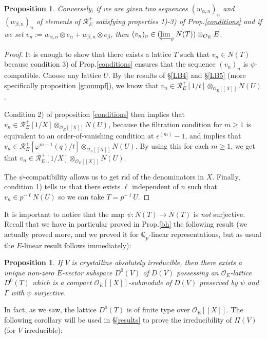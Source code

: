 \documentclass[11pt]{amsart}
\def\limproj{\mathop{\oalign{{\rm lim}\cr 
\hidewidth$\longleftarrow$\hidewidth\cr}}}
\def\Q{{\mathbb Q}_p}
\def\O{{\mathcal O}_E}
\newtheorem{prop}[definit]{\bf{Proposition}}
\begin{document}
\begin{prop}\label{conditions2} 
Conversely, if we are given two sequences $(w_{\alpha,n})_n$ and $(w_{\beta,n})_n$  
of elements of ${\mathcal R}_E^+$ satisfying properties 1)-3) of  
Prop.\ref{conditions} and if we set $v_n := w_{\alpha,n} \otimes  
e_\alpha + w_{\beta,n} \otimes e_\beta$, then $(v_n)_n \in  
(\limproj_{\psi}N(T)) \otimes_{\O} E$. 
\end{prop} 
\begin{proof} 
It is enough to show that there exists a lattice $T$ such that $v_n 
\in N(T)$ because condition 3) of Prop.\ref{conditions} ensures  
that the sequence $(v_n)_n$ is $\psi$-compatible. Choose any lattice $U$. By the  
results of \S\ref{LB4} and \S\ref{LB5} (more specifically proposition
\ref{groumpf}), we know that 
$v_n \in {\mathcal R}_E^+[1/t] \otimes_{\O[[X]]} N(U)$. 

Condition 2) of proposition \ref{conditions} then implies that 
$v_n \in {\mathcal R}_E^+[1/X] \otimes_{\O[[X]]} N(U)$, because the
filtration condition for $m \geq 1$ is equivalent to an
order-of-vanishing condition at $\epsilon^{(m)}-1$, and implies
that $v_n \in {\mathcal R}_E^+[\varphi^{m-1}(q) / t] \otimes_{\O[[X]]}
N(U)$. By using this for each $m \geq 1$, we get that 
$v_n \in {\mathcal R}_E^+[1/X] \otimes_{\O[[X]]} N(U)$.

The $\psi$-compatibility allows us to get rid of the denominators in $X$.  
Finally, condition 1) tells us that there exists $\ell$ independent of $n$  
such that $v_n \in p^{-\ell} N(U)$ so we can take $T=p^{-\ell}U$.  
\end{proof} 
 
It is important to notice that the map $\psi: N(T) \rightarrow N(T)$  
is {\it not} surjective. Recall that we have in particular proved  
in Prop.\ref{bh} the following result (we actually proved more, and we proved it for 
$\Q$-linear representations, but as usual the $E$-linear result 
follows immediately): 
 
\begin{prop}\label{berger} 
If $V$ is crystalline absolutely irreducible, 
then there exists a \emph{unique} 
non-zero $E$-vector subspace $D^0(V)$ of $D(V)$  
possessing an $\O$-lattice $D^0(T)$  
which is a compact $\O[[X]]$-submodule  
of $D(V)$ preserved by $\psi$ and $\Gamma$ with $\psi$ surjective. 
\end{prop} 
 
In fact, as we saw, the lattice $D^0(T)$ is 
of finite type over $\O[[X]]$. The following corollary will 
be used in \S\ref{results} to prove the  
irreducibility of $\Pi(V)$ (for $V$ irreducible): 
 
\end{document}
